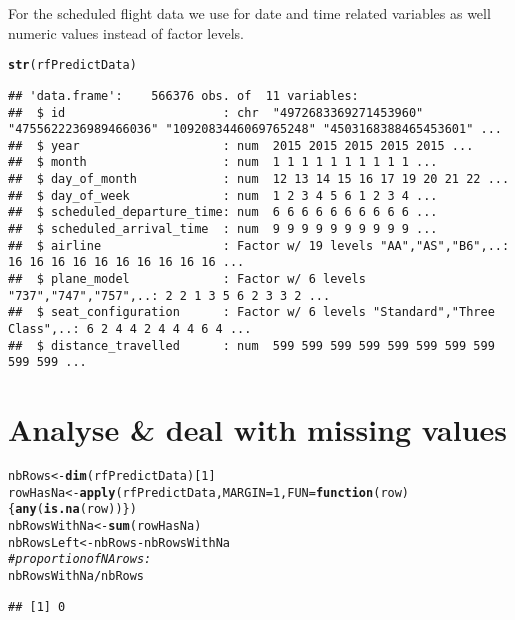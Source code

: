 \documentclass{article}\usepackage[]{graphicx}\usepackage[]{color}
\makeatletter
\newcommand{\hlnum}[1]{\textcolor[rgb]{0.686,0.059,0.569}{#1}}%
\newcommand{\hlcom}[1]{\textcolor[rgb]{0.678,0.584,0.686}{\textit{#1}}}%
\newcommand{\hlopt}[1]{\textcolor[rgb]{0,0,0}{#1}}%
\newcommand{\hlstd}[1]{\textcolor[rgb]{0.345,0.345,0.345}{#1}}%
\newcommand{\hlkwa}[1]{\textcolor[rgb]{0.161,0.373,0.58}{\textbf{#1}}}%
\newcommand{\hlkwb}[1]{\textcolor[rgb]{0.69,0.353,0.396}{#1}}%
\newcommand{\hlkwc}[1]{\textcolor[rgb]{0.333,0.667,0.333}{#1}}%
\newcommand{\hlkwd}[1]{\textcolor[rgb]{0.737,0.353,0.396}{\textbf{#1}}}%
\newenvironment{kframe}{%
 \def\at@end@of@kframe{}%
 \ifinner\ifhmode%
  \def\at@end@of@kframe{\end{minipage}}%
  \begin{minipage}{\columnwidth}%
 \fi\fi%
 \def\FrameCommand##1{\hskip\@totalleftmargin \hskip-\fboxsep
 \colorbox{shadecolor}{##1}\hskip-\fboxsep
     \hskip-\linewidth \hskip-\@totalleftmargin \hskip\columnwidth}%
 \MakeFramed {\advance\hsize-\width
   \@totalleftmargin\z@ \linewidth\hsize
   \@setminipage}}%
 {\par\unskip\endMakeFramed%
 \at@end@of@kframe}
\newenvironment{knitrout}{}{} %
\makeatother
\begin{document}
For the scheduled flight data we use for date and time related variables as well numeric values instead of factor levels.

\begin{knitrout}
\color{fgcolor}\begin{kframe}
\begin{alltt}
\hlkwd{str}\hlstd{(rfPredictData)}
\end{alltt}
\begin{verbatim}
## 'data.frame':	566376 obs. of  11 variables:
##  $ id                      : chr  "4972683369271453960" "4755622236989466036" "1092083446069765248" "4503168388465453601" ...
##  $ year                    : num  2015 2015 2015 2015 2015 ...
##  $ month                   : num  1 1 1 1 1 1 1 1 1 1 ...
##  $ day_of_month            : num  12 13 14 15 16 17 19 20 21 22 ...
##  $ day_of_week             : num  1 2 3 4 5 6 1 2 3 4 ...
##  $ scheduled_departure_time: num  6 6 6 6 6 6 6 6 6 6 ...
##  $ scheduled_arrival_time  : num  9 9 9 9 9 9 9 9 9 9 ...
##  $ airline                 : Factor w/ 19 levels "AA","AS","B6",..: 16 16 16 16 16 16 16 16 16 16 ...
##  $ plane_model             : Factor w/ 6 levels "737","747","757",..: 2 2 1 3 5 6 2 3 3 2 ...
##  $ seat_configuration      : Factor w/ 6 levels "Standard","Three Class",..: 6 2 4 4 2 4 4 4 6 4 ...
##  $ distance_travelled      : num  599 599 599 599 599 599 599 599 599 599 ...
\end{verbatim}
\end{kframe}
\end{knitrout}

\section{Analyse \& deal with missing values}

\begin{knitrout}
\color{fgcolor}\begin{kframe}
\begin{alltt}
\hlstd{nbRows} \hlkwb{<-} \hlkwd{dim}\hlstd{(rfPredictData)[}\hlnum{1}\hlstd{]}
\hlstd{rowHasNa} \hlkwb{<-} \hlkwd{apply}\hlstd{(rfPredictData,} \hlkwc{MARGIN}\hlstd{=}\hlnum{1}\hlstd{,} \hlkwc{FUN}\hlstd{=}\hlkwa{function}\hlstd{(}\hlkwc{row}\hlstd{)\{} \hlkwd{any}\hlstd{(}\hlkwd{is.na}\hlstd{(row)) \})}
\hlstd{nbRowsWithNa} \hlkwb{<-} \hlkwd{sum}\hlstd{(rowHasNa)}
\hlstd{nbRowsLeft} \hlkwb{<-} \hlstd{nbRows} \hlopt{-} \hlstd{nbRowsWithNa}
\hlcom{# proportion of NA rows:}
\hlstd{nbRowsWithNa} \hlopt{/} \hlstd{nbRows}
\end{alltt}
\begin{verbatim}
## [1] 0
\end{verbatim}
\end{kframe}
\end{knitrout}
\end{document}
